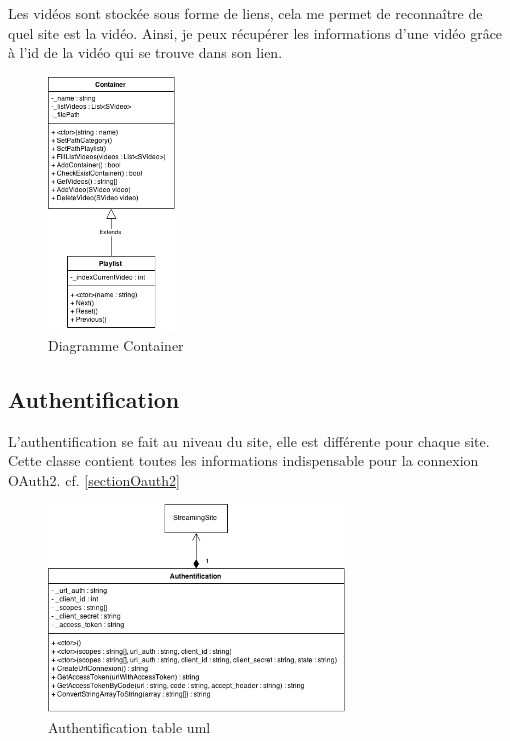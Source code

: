 \documentclass[11pt]{report} %
\begin{document}
			Les vidéos sont stockée sous forme de liens, cela me permet de reconnaître de quel site est la vidéo. Ainsi, je peux récupérer les informations d'une vidéo grâce à l'id de la vidéo qui se trouve dans son lien.
				
			\begin{figure}[h]
				\center
				\includegraphics[width=0.3\textwidth]{../img/Container.png}
				\caption{Diagramme Container}
				\label{Container}
			\end{figure}
			
			\newpage 
			\subsection{Authentification}
			L'authentification se fait au niveau du site, elle est différente pour chaque site.
			Cette classe contient toutes les informations indispensable pour la connexion OAuth2. cf. \ref{sectionOauth2}
			
			\begin{figure}[h]
				\center
				\includegraphics[width=0.7\textwidth]{../img/authuml.png}
				\caption{Authentification table uml}
				\label{authuml}
			\end{figure}
			
\end{document}
